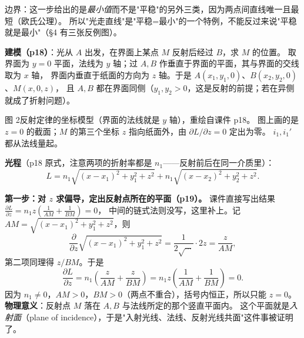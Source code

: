 \documentclass[11pt]{ctexart}
\begin{document}
边界：这一步给出的是\emph{最小值}而不是"平稳"的另外三类，因为两点间直线唯一且最短（欧氏公理）。
所以"光走直线"是"平稳=最小"的一个特例，不能反过来说"平稳就是最小"（§4 有三张反例图）。


\textbf{建模（p18）}：光从 $A$ 出发，在界面上某点 $M$ 反射后经过 $B$，求 $M$ 的位置。
取界面为 $y=0$ 平面，法线为 $y$ 轴；过 $A,B$ 作垂直于界面的平面，其与界面的交线取为 $x$ 轴，
界面内垂直于纸面的方向为 $z$ 轴。于是 $A(x_1,y_1,0)$、$B(x_2,y_2,0)$、$M(x,0,z)$，
且 $A,B$ 都在界面同侧（$y_1,y_2>0$，这是反射的前提；若在异侧就成了折射问题）。

\begin{center}

{\small\color{inkgray}图 2\quad 反射定律的坐标模型（界面的法线就是 $y$ 轴），重绘自课件 p18。
图上画的是 $z=0$ 的截面；$M$ 的第三个坐标 $z$ 指向纸面外，由 $\partial L/\partial z=0$ 定出为零。
$i_1,i_1'$ 都从法线量起。}
\end{center}

\textbf{光程}（p18 原式，注意两项的折射率都是 $n_1$——反射前后在同一介质里）：
\[
L=n_1\sqrt{(x-x_1)^2+y_1^2+z^2}+n_1\sqrt{(x-x_2)^2+y_2^2+z^2}.
\]

\textbf{第一步：对 $z$ 求偏导，定出反射点所在的平面（p19）。}
课件直接写出结果 $\frac{\partial L}{\partial z}=n_1z\left(\frac{1}{AM}+\frac{1}{BM}\right)=0$，
中间的链式法则没写，这里补上。记 $AM=\sqrt{(x-x_1)^2+y_1^2+z^2}$，则
\[
\frac{\partial}{\partial z}\sqrt{(x-x_1)^2+y_1^2+z^2}
=\frac{1}{2\sqrt{\cdots}}\cdot 2z=\frac{z}{AM},
\]
第二项同理得 $z/BM$。于是
\[
\frac{\partial L}{\partial z}
=n_1\left(\frac{z}{AM}+\frac{z}{BM}\right)
=n_1z\left(\frac{1}{AM}+\frac{1}{BM}\right)=0 .
\]
因为 $n_1\neq0$，$AM>0$，$BM>0$（两点不重合），括号内恒正，所以只能 $z=0$。
\textbf{物理意义}：反射点 $M$ 落在 $A,B$ 与法线所定的那个竖直平面内。
这个平面就是\emph{入射面}（plane of incidence），于是"入射光线、法线、反射光线共面"这件事被证明了。
\end{document}
